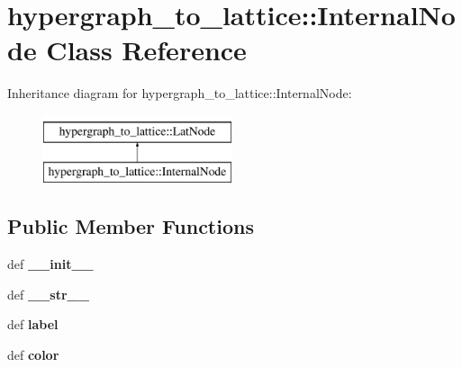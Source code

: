 \hypertarget{classhypergraph__to__lattice_1_1InternalNode}{
\section{hypergraph\_\-to\_\-lattice::InternalNode Class Reference}
\label{classhypergraph__to__lattice_1_1InternalNode}
}
Inheritance diagram for hypergraph\_\-to\_\-lattice::InternalNode:\begin{figure}[H]
\begin{center}
\leavevmode
\includegraphics[height=2cm]{classhypergraph__to__lattice_1_1InternalNode}
\end{center}
\end{figure}
\subsection*{Public Member Functions}
\begin{DoxyCompactItemize}
\item 
\hypertarget{classhypergraph__to__lattice_1_1InternalNode_a702ef58a215dca7d9daf128d27beb55f}{
def {\bfseries \_\-\_\-init\_\-\_\-}}
\label{classhypergraph__to__lattice_1_1InternalNode_a702ef58a215dca7d9daf128d27beb55f}

\item 
\hypertarget{classhypergraph__to__lattice_1_1InternalNode_acf3fb3d51a4de329b3360ec460c09236}{
def {\bfseries \_\-\_\-str\_\-\_\-}}
\label{classhypergraph__to__lattice_1_1InternalNode_acf3fb3d51a4de329b3360ec460c09236}

\item 
\hypertarget{classhypergraph__to__lattice_1_1InternalNode_ae39bd390cd71113c83ff5851504d85f0}{
def {\bfseries label}}
\label{classhypergraph__to__lattice_1_1InternalNode_ae39bd390cd71113c83ff5851504d85f0}

\item 
\hypertarget{classhypergraph__to__lattice_1_1InternalNode_a0f0f96e543b0940777f6d66dc6d8fec0}{
def {\bfseries color}}
\label{classhypergraph__to__lattice_1_1InternalNode_a0f0f96e543b0940777f6d66dc6d8fec0}

\end{DoxyCompactItemize}
